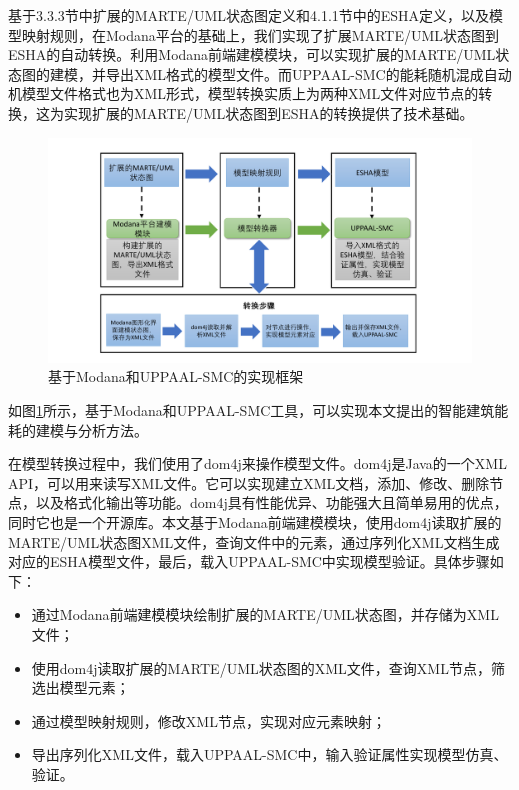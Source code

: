 
	基于3.3.3节中扩展的MARTE/UML状态图定义和4.1.1节中的ESHA定义，以及模型映射规则，在Modana平台的基础上，我们实现了扩展MARTE/UML状态图到ESHA的自动转换。利用Modana前端建模模块，可以实现扩展的MARTE/UML状态图的建模，并导出XML格式的模型文件。而UPPAAL-SMC的能耗随机混成自动机模型文件格式也为XML形式，模型转换实质上为两种XML文件对应节点的转换，这为实现扩展的MARTE/UML状态图到ESHA的转换提供了技术基础。
	
	\begin{figure}[!t]
	\centering
	\includegraphics[width=4.6in]{tran.pdf}
	\caption{基于Modana和UPPAAL-SMC的实现框架}
	\label{tools}
	\end{figure}
	
	如图\ref{tools}所示，基于Modana和UPPAAL-SMC工具，可以实现本文提出的智能建筑能耗的建模与分析方法。
	
	在模型转换过程中，我们使用了dom4j来操作模型文件。dom4j是Java的一个XML API，可以用来读写XML文件。它可以实现建立XML文档，添加、修改、删除节点，以及格式化输出等功能。dom4j具有性能优异、功能强大且简单易用的优点，同时它也是一个开源库。本文基于Modana前端建模模块，使用dom4j读取扩展的MARTE/UML状态图XML文件，查询文件中的元素，通过序列化XML文档生成对应的ESHA模型文件，最后，载入UPPAAL-SMC中实现模型验证。具体步骤如下：
	\begin{itemize}
	\item 通过Modana前端建模模块绘制扩展的MARTE/UML状态图，并存储为XML文件；
	\item 使用dom4j读取扩展的MARTE/UML状态图的XML文件，查询XML节点，筛选出模型元素；
	\item 通过模型映射规则，修改XML节点，实现对应元素映射；
	\item 导出序列化XML文件，载入UPPAAL-SMC中，输入验证属性实现模型仿真、验证。
	\end{itemize}
	
